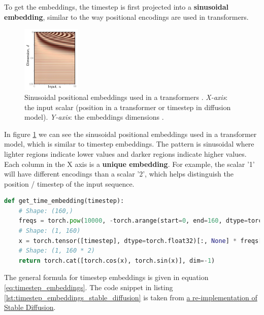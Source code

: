To get the embeddings, the timestep is first projected into a \textbf{sinusoidal embedding}, similar to the way positional encodings are used in transformers.

\begin{figure}[h]
    \centering
    \includegraphics[width=0.25\textwidth]{images/diffusion_models/stable_diffusion/positional_encodings.png}
    \caption{Sinusoidal positional embeddings used in a transformers \cite{understanding_deep_learning_book_2024}. \textit{X-axis}: the input scalar (position in a transformer or timestep in diffusion model). \textit{Y-axis}: the embeddings dimensions \cite{understanding_deep_learning_book_2024}.}
    \label{fig:sinusoidal_embeddings}
\end{figure}

In figure \ref{fig:sinusoidal_embeddings} we can see the sinusoidal positional embeddings used in a transformer model, which is similar to timestep embeddings. The pattern is sinusoidal where lighter regions indicate lower values and darker regions indicate higher values. Each column in the X axis is a \textbf{unique embedding}. For example, the scalar '1' will have different encodings than a scalar '2', which helps distinguish the position / timestep of the input sequence.

\begin{lstlisting}[language=Python, breaklines=true, caption={Timestep embeddings in Stable Diffusion: we convert the timestep to an embedding.}, label={lst:timestep_embeddings_stable_diffusion}]
def get_time_embedding(timestep):
    # Shape: (160,)
    freqs = torch.pow(10000, -torch.arange(start=0, end=160, dtype=torch.float32) / 160) 
    # Shape: (1, 160)
    x = torch.tensor([timestep], dtype=torch.float32)[:, None] * freqs[None]
    # Shape: (1, 160 * 2)
    return torch.cat([torch.cos(x), torch.sin(x)], dim=-1)
\end{lstlisting}

The general formula for timestep embeddings is given in equation \ref{eq:timestep_embeddings}. The code snippet in listing \ref{lst:timestep_embeddings_stable_diffusion} is taken from \href{https://github.com/hkproj/pytorch-stable-diffusion/blob/e0cb06de011787cdf13eed7b4287ad8410491149/sd/pipeline.py#L164}{a re-implementation of Stable Diffusion}.

